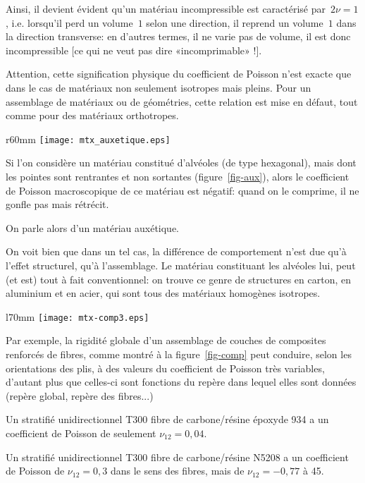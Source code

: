 Ainsi, il devient évident qu'un matériau incompressible
est caractérisé par~$2\nu=1$,
i.e. lorsqu'il perd un volume~$1$ selon une direction, il reprend un volume~$1$ dans
la direction transverse: en d'autres termes, il ne varie pas de volume, il est donc
incompressible [ce qui ne veut pas dire «incomprimable» !].

\medskip
Attention, cette signification physique du coefficient de Poisson n'est exacte que dans le cas 
de matériaux non seulement isotropes mais pleins.
Pour un assemblage de matériaux ou de géométries, cette relation est mise en
défaut, tout comme pour des matériaux orthotropes.

\medskip
\begin{wrapfigure}{r}{60mm}
  \centering
  \texttt{[image: mtx\_auxetique.eps]}
  \caption{Matériau auxétique}\label{fig-aux}
\end{wrapfigure}
Si l'on considère un matériau constitué d'alvéoles (de type hexagonal), mais dont
les pointes sont rentrantes et non sortantes (figure~\ref{fig-aux}), alors le coefficient de Poisson macroscopique 
de ce matériau est négatif: quand on le comprime, il ne gonfle pas mais rétrécit.

On parle alors d'un matériau auxétique.

On voit bien que dans un tel cas, la différence de comportement n'est due qu'à l'effet structurel, qu'à l'assemblage.
Le matériau constituant les alvéoles lui, peut (et est) tout à fait conventionnel: on trouve ce genre de structures
en carton, en aluminium et en acier, qui sont tous des matériaux homogènes isotropes.


\medskip
\begin{wrapfigure}{l}{70mm}
  \centering
  \texttt{[image: mtx-comp3.eps]}
  \caption{Matériau composite}\label{fig-comp}
\end{wrapfigure}
Par exemple, la rigidité globale d'un assemblage de couches de composites
renforcés de fibres, comme montré à la figure~\ref{fig-comp} peut conduire, selon les orientations des plis, à des
valeurs du coefficient de Poisson très variables, d'autant plus que celles-ci sont fonctions du repère dans lequel
elles sont données (repère global, repère des fibres...)

Un stratifié unidirectionnel T300 fibre de carbone/résine époxyde 934 a un coefficient de Poisson de seulement $\nu_{12}=0,04$.

Un stratifié unidirectionnel T300 fibre de carbone/résine N5208 a un coefficient de Poisson de $\nu_{12}=0,3$ dans le sens des fibres,
mais de $\nu_{12}=-0,77$ à 45\degres.

